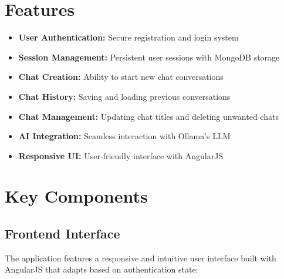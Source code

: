 \documentclass[12pt,a4paper]{article}
\begin{document}
\section{Features}
\begin{itemize}
\item \textbf{User Authentication:} Secure registration and login system
\item \textbf{Session Management:} Persistent user sessions with MongoDB storage
\item \textbf{Chat Creation:} Ability to start new chat conversations
\item \textbf{Chat History:} Saving and loading previous conversations
\item \textbf{Chat Management:} Updating chat titles and deleting unwanted chats
\item \textbf{AI Integration:} Seamless interaction with Ollama's LLM
\item \textbf{Responsive UI:} User-friendly interface with AngularJS
\end{itemize}

\section{Key Components}

\subsection{Frontend Interface}
The application features a responsive and intuitive user interface built with AngularJS that adapts based on authentication state:
\end{document}
